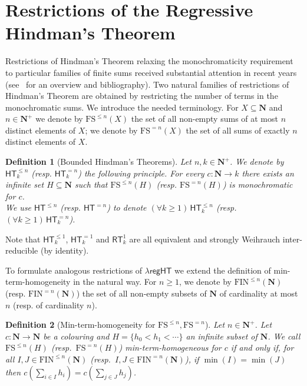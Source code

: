 \documentclass[a4paper,11pt]{article}
\newtheorem{definition}{Definition}
\newcommand\Nat{\mathbf{N}}
\newcommand\HT{\mathsf{HT}}
\newcommand\RT{\mathsf{RT}}
\newcommand\regHT{\mathsf{regHT}}
\newcommand\FIN{\mathrm{FIN}}
\newcommand\FS{\mathrm{FS}}
\begin{document}
\section{Restrictions of the Regressive Hindman's Theorem} \label{sec:restrictions}

Restrictions of Hindman's Theorem relaxing the monochromaticity requirement to particular families of 
finite sums received substantial attention in recent years (see~\cite{Car:2021} for an overview and bibliography).
Two natural families of restrictions of Hindman's Theorem are obtained by restricting the number of terms in the monochromatic sums. We introduce the needed terminology. For $X\subseteq \Nat$ and $n\in\Nat^+$ we denote by $\FS^{\leq n}(X)$ the set of all non-empty sums of at most $n$ distinct elements of $X$; we denote by $\FS^{=n}(X)$ the set of all sums of exactly $n$ distinct elements of $X$. 

\begin{definition}[Bounded Hindman's Theorems]
Let $n, k\in\Nat^+$. We denote by $\HT^{\leq n}_k$ (resp. $\HT^{=n}_k$) the following principle.
For every $c:\Nat \to k$ there exists an infinite set $H\subseteq\Nat$ such that $\FS^{\leq n}(H)$ (resp. $\FS^{=n}(H)$)
is monochromatic for $c$.\\
We use $\HT^{\leq n}$ (resp. $\HT^{=n}$) to denote $(\forall k \geq 1)\,\HT^{\leq n}_k$ (resp. $(\forall k \geq 1)\,\HT^{=n}_k$).
\end{definition}

Note that $\HT^{\leq 1}_k$, $\HT^{=1}_k$ and $\RT^1_k$ are all equivalent and strongly Weihrauch inter-reducible (by identity). 

To formulate analogous restrictions of $\lambda\regHT$ we extend the definition of min-term-homogeneity in the natural way. For $n\geq 1$, we denote by $\FIN^{\leq n}(\Nat)$ (resp. $\FIN^{=n}(\Nat)$) the set of all non-empty subsets of $\Nat$ of cardinality at most $n$ (resp. of cardinality $n$).

\begin{definition}[Min-term-homogeneity for $\FS^{\leq n},\FS^{=n}$]
Let $n\in\Nat^+$. Let $c:\Nat\to \Nat$ be a colouring and $H=\{h_0 < h_1 < \cdots \}$ an infinite subset
of $\Nat$. 
We call $\FS^{\leq n}(H)$ (resp.~$\FS^{=n}(H)$) min-term-homogeneous for $c$
if and only if, 
for all $I, J \in \FIN^{\leq n}(\Nat)$ (resp.~$I, J \in \FIN^{=n}(\Nat)$), if $\min(I)=\min(J)$ then 
$c(\sum_{i \in I} h_i) = c(\sum_{j\in J} h_j)$.
\end{definition}
\end{document}
